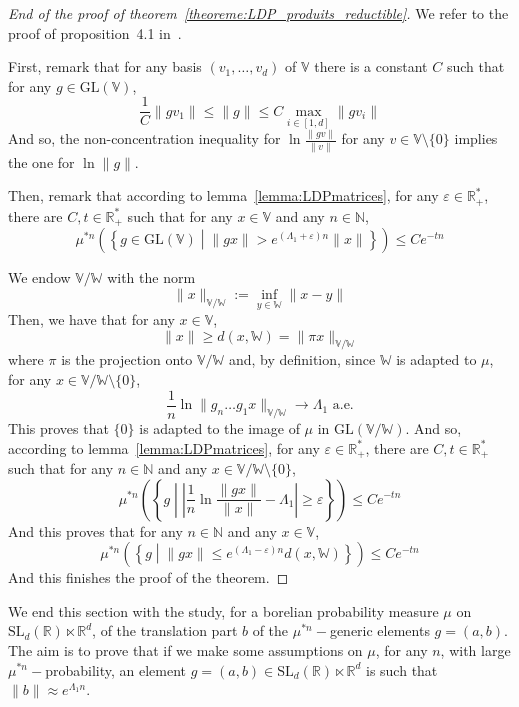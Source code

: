 \documentclass[11pt]{amsart}
\theoremstyle{definition}
\theoremstyle{remark}
\numberwithin{equation}{section}
\begin{document}
\begin{proof}[End of the proof of theorem~\ref{theoreme:LDP_produits_reductible}]
We refer to the proof of proposition~4.1 in~\cite{BQlin}.

First, remark that for any basis $(v_1 , \dots , v_d)$ of ${\mathbb V}$ there is a constant $C$ such that for any $g\in \mathrm{GL}({\mathbb V})$,
\[
\frac 1 C\|gv_1\| \leqslant \|g\| \leqslant C \max_{i\in [1,d]} \|gv_i\|
\]
And so, the non-concentration inequality for $\ln\frac{\|gv\|}{\|v\|}$ for any $v\in {\mathbb V}\setminus\{0\}$ implies the one for $\ln\|g\|$.

Then, remark that according to lemma~\ref{lemma:LDPmatrices}, for any $\varepsilon \in {\mathbb R}_+^\ast$, there are $C,t\in {\mathbb R}_+^\ast$ such that for any $x\in {\mathbb V}$ and any $n\in {\mathbb N}$,
\[
\mu^{\ast n} \left(\left\{ g\in \mathrm{GL}({\mathbb V}) \middle| \|gx\| > e^{(\Lambda_1 + \varepsilon)n} \|x\|\right\}\right) \leqslant Ce^{-tn}
\]

We endow ${\mathbb V}/{\mathbb W}$ with the norm
\[
\|x\|_{{\mathbb V}/{\mathbb W}} := \inf_{y\in {\mathbb W}} \|x-y\|
\]
Then, we have that for any $x\in {\mathbb V}$,
\[
\|x\| \geqslant d(x,{\mathbb W}) = \|\pi x\|_{{\mathbb V}/{\mathbb W}}
\]
where $\pi$ is the projection onto ${\mathbb V}/{\mathbb W}$ and, by definition, since ${\mathbb W}$ is adapted to $\mu$, for any $x\in {\mathbb V}/{\mathbb W} \setminus\{0\}$,
\[
\frac 1 n \ln \|g_n \dots g_1 x\|_{{\mathbb V}/{\mathbb W}} \xrightarrow\, \Lambda_1 \text{ a.e.}
\]
This proves that $\{0\}$ is adapted to the image of $\mu$ in $\mathrm{GL}({\mathbb V}/{\mathbb W})$. And so, according to lemma~\ref{lemma:LDPmatrices}, for any $\varepsilon \in {\mathbb R}_+^\ast$, there are $C,t\in {\mathbb R}_+^\ast$ such that for any $n\in {\mathbb N}$ and any $x\in {\mathbb V}/{\mathbb W} \setminus\{0\}$,
\[
\mu^{\ast n }\left(\left\{ g\middle| \left| \frac 1 n \ln \frac{\|gx\|}{\|x\|} - \Lambda_1\right| \geqslant \varepsilon\right\}\right) \leqslant Ce^{-tn}
\]
And this proves that for any $n\in {\mathbb N}$ and any $x\in {\mathbb V}$,
\[
\mu^{\ast n} \left(\left\{ g\middle| \|gx\| \leqslant e^{(\Lambda_1 - \varepsilon)n} d(x,{\mathbb W}) \right\}\right) \leqslant Ce^{-tn}
\]
And this finishes the proof of the theorem.
\end{proof}

We end this section with the study, for a borelian probability measure $\mu$ on $\mathrm{SL}_d({\mathbb R}) \ltimes {\mathbb R}^d$, of the translation part $b$ of the $\mu^{\ast n}-$generic elements $g=(a,b)$. The aim is to prove that if we make some assumptions on $\mu$, for any $n$, with large $\mu^{\ast n}-$probability, an element $g=(a,b)\in \mathrm{SL}_d({\mathbb R}) \ltimes {\mathbb R}^d$ is such that $\|b\|\approx e^{\Lambda_1 n}$.
\end{document}
